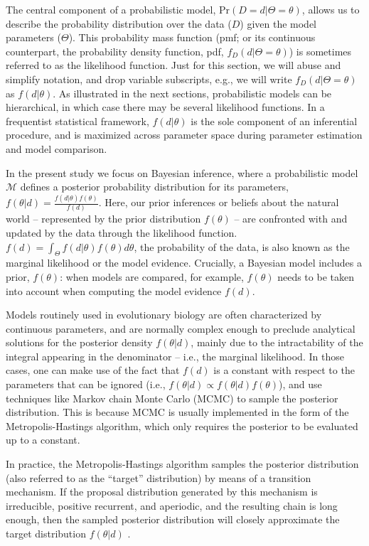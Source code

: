 \documentclass[oneside]{article}
\begin{document}
The central component of a probabilistic model, $\text{Pr}(D=d|\Theta=\theta)$, allows us to describe the probability distribution over the data ($D$) given the model parameters ($\Theta$).
This probability mass function (pmf; or its continuous counterpart, the probability density function, pdf, $f_D(d|\Theta=\theta)$) is sometimes referred to as the likelihood function.
Just for this section, we will abuse and simplify notation, and drop variable subscripts, e.g., we will write $f_D(d|\Theta=\theta)$  as $f(d|\theta)$.
As illustrated in the next sections, probabilistic models can be hierarchical, in which case there may be several likelihood functions.
In a frequentist statistical framework, $f(d|\theta)$ is the sole component of an inferential procedure, and is maximized across parameter space during parameter estimation and model comparison.

In the present study we focus on Bayesian inference, where a probabilistic model $\mathcal{M}$ defines a posterior  probability distribution for its parameters, $f(\theta|d) = \frac{f(d|\theta)f(\theta)}{f(d)}$.
Here, our prior inferences or beliefs about the natural world -- represented by the prior distribution $f(\theta)$ -- are confronted with and updated by the data through the likelihood function.
$f(d) = \int_\Theta f(d|\theta)f(\theta)d\theta$, the probability of the data, is also known as the marginal likelihood or the model evidence.
Crucially, a Bayesian model includes a prior, $f(\theta)$: when models are compared, for example, $f(\theta)$ needs to be taken into account when computing the model evidence $f(d)$.

Models routinely used in evolutionary biology are often characterized by continuous parameters, and are normally complex enough to preclude analytical solutions for the posterior density $f(\theta|d)$, mainly due to the intractability of the integral appearing in the denominator -- i.e., the marginal likelihood.
In those cases, one can make use of the fact that $f(d)$ is a constant with respect to the parameters that can be ignored (i.e., $f(\theta|d) \propto f(\theta|d)f(\theta)$), and use techniques like Markov chain Monte Carlo (MCMC) to sample the posterior distribution.
This is because MCMC is usually implemented in the form of the Metropolis-Hastings \citep{metropolis53,mh} algorithm, which only requires the posterior to be evaluated up to a constant.

In practice, the Metropolis-Hastings algorithm samples the posterior distribution (also referred to as the ``target'' distribution) by means of a
transition mechanism. 
If the proposal distribution generated by this mechanism is irreducible, positive recurrent, and aperiodic, and the resulting chain is long enough, then the sampled posterior distribution will closely approximate the target distribution $f(\theta|d)$ \citep{smith93,tierney94,gelman}.
\end{document}
